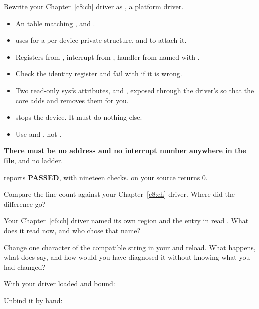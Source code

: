Rewrite your Chapter~\ref{c8:ch} driver as , a platform driver.
\begin{itemize}
  \item An  table matching , and
    .
  \item {} uses  for a per-device private structure, and
     to attach it.
  \item Registers from , interrupt from
    , handler from  named with
    .
  \item Check the identity register and fail with  if it is wrong.
  \item Two read-only sysfs attributes,  and , exposed through the
    driver's  so that the core adds and removes them for you.
  \item {} stops the device. It must do nothing else.
  \item Use  and , not .
\end{itemize}
\textbf{There must be no address and no interrupt number anywhere in the file}, and no 
ladder.

\checkyourself {} reports \textbf{PASSED}, with nineteen checks.  on your source returns 0.

 Compare the line count against your Chapter~\ref{c8:ch} driver. Where did the difference
go?

 Your Chapter~\ref{c6:ch} driver named its own region and the entry in 
read . What does it read now, and who chose that name?

 Change one character of the compatible string in your  and reload.
What happens, what does  say, and how would you have diagnosed it without knowing what
you had changed?

\label{c10:ex:7}

With your driver loaded and bound:

 Unbind it by hand:

